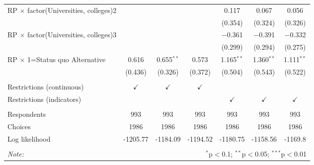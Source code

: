 \begin{table}[!htbp]
\begin{tabular}{@{\extracolsep{5pt}}lcccccc}
  RP $\times$ factor(Universities, colleges)2 &  &  &  & 0.117 & 0.067 & 0.056 \\ 
  &  &  &  & (0.354) & (0.324) & (0.326) \\ 
  RP $\times$ factor(Universities, colleges)3 &  &  &  & $-$0.361 & $-$0.391 & $-$0.332 \\ 
  &  &  &  & (0.299) & (0.294) & (0.275) \\ 
  RP $\times$ 1=Status quo Alternative & 0.616 & 0.655$^{**}$ & 0.573 & 1.165$^{**}$ & 1.360$^{**}$ & 1.111$^{**}$ \\ 
  & (0.436) & (0.326) & (0.372) & (0.504) & (0.543) & (0.522) \\ 
 \hline \\[-1.8ex] 
Restrictions (continuous) & $\checkmark$ & $\checkmark$ & $\checkmark$ & & & \\ 
Restrictions (indicators) & & & & $\checkmark$ & $\checkmark$ & $\checkmark$ \\ 
\hline \\[-1.8ex]Respondents & 993 & 993 & 993 & 993 & 993 & 993\\ 
 Choices & 1986 & 1986 & 1986 & 1986 & 1986 & 1986\\
Log likelihood & -1205.77 & -1184.09 & -1194.52 & -1180.75 & -1158.56 & -1169.8 \\ 
 
\hline 
\hline \\[-1.8ex] 
\textit{Note:}  & \multicolumn{6}{r}{$^{*}$p$<$0.1; $^{**}$p$<$0.05; $^{***}$p$<$0.01} \\ 
\end{tabular} 
\end{table} 
